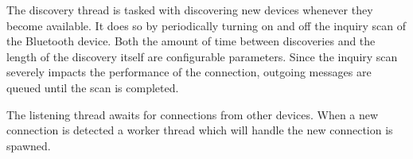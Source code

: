 The discovery thread is tasked with discovering new devices whenever they become available.
It does so by periodically turning on and off the inquiry scan of the Bluetooth device.
Both the amount of time between discoveries and the length of the discovery itself are configurable parameters.
Since the inquiry scan severely impacts the performance of the connection, outgoing messages are queued until the scan is completed.

The listening thread awaits for connections from other devices. When a new connection is detected a worker thread which will handle the new connection is spawned.











